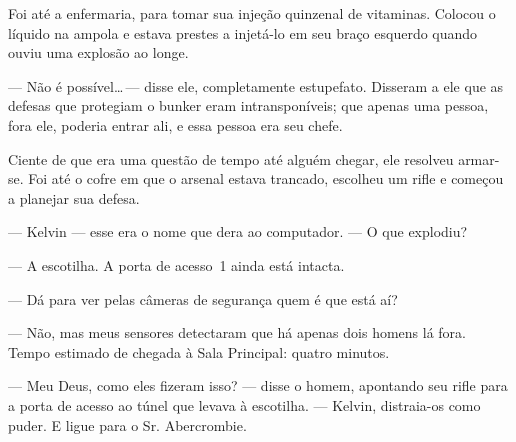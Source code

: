 Foi até a enfermaria, para tomar sua injeção quinzenal de vitaminas.
Colocou o líquido na ampola e estava prestes a injetá-lo em seu braço
esquerdo quando ouviu uma explosão ao longe.

--- Não é possível\ldots\,--- disse ele, completamente estupefato.
Disseram a ele que as defesas que protegiam o bunker eram
intransponíveis; que apenas uma pessoa, fora ele, poderia entrar ali, e
essa pessoa era seu chefe.

Ciente de que era uma questão de tempo até alguém chegar, ele resolveu
armar-se. Foi até o cofre em que o arsenal estava trancado, escolheu um
rifle e começou a planejar sua defesa.

--- Kelvin --- esse era o nome que dera ao computador. --- O que
explodiu?

--- A escotilha. A porta de acesso~1 ainda está intacta.

--- Dá para ver pelas câmeras de segurança quem é que está aí?

--- Não, mas meus sensores detectaram que há apenas dois homens lá fora.
Tempo estimado de chegada à Sala Principal: quatro minutos.

--- Meu Deus, como eles fizeram isso? --- disse o homem, apontando seu
rifle para a porta de acesso ao túnel que levava à escotilha. ---
Kelvin, distraia-os como puder. E ligue para o Sr. Abercrombie.
